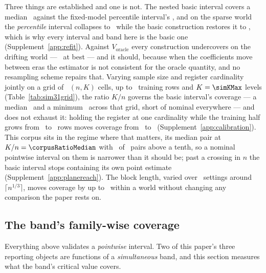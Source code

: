 Three things are established and one is not. The nested basic interval
covers a median \coverageNestedBasicMedian\ against the fixed-model
percentile interval's \coverageNaiveMedian, and on the sparse world the
\emph{percentile} interval collapses to \coverageSparsePct\ while the basic
construction restores it to \coverageSparseBasic, which is why every interval
and band here is the basic one (Supplement~\ref{app:refit}). Against
$V_{\mathrm{oracle}}$ every construction undercovers on the drifting world
--- \coverageDriftOracle\ at best --- and it should, because when the
coefficients move between eras the estimator is not consistent for the
oracle quantity, and no resampling scheme repairs that. Varying sample size
and register cardinality jointly on a grid of \nSimGridCells\ $(n, K)$
cells, up to \simNMax\ training rows and $K = \simKMax$ levels
(Table~\ref{tab:sim31grid}), the ratio $K/n$ governs the basic interval's
coverage --- a median \coverageGridMedian\ and a minimum \coverageGridMin\
across that grid, short
of nominal everywhere --- and does not exhaust it: holding the register at
one cardinality while the training half grows from \simGridFixedNa\ to
\simGridFixedNb\ rows moves coverage from \simGridFixedCovA\ to
\simGridFixedCovB\ (Supplement~\ref{app:calibration}). This corpus sits in
the regime where that matters, its median pair at $K/n = \corpusRatioMedian$
with \nPairsRatioAboveTenth\ of \nPairs\ pairs above a tenth, so a nominal
pointwise interval on them is narrower than it should be; past a crossing in
$n$ the basic interval stops containing its own point estimate
(Supplement~\ref{app:planereach}). The block length, varied over
\nSimBlockLengths\ settings around $\lceil n^{1/3} \rceil$, moves coverage by
up to \coverageBlockSpreadMaxPts\ within a world without changing any
comparison the paper rests on.

\subsection{The band's family-wise coverage}
\label{sec:simband}

Everything above validates a \emph{pointwise} interval. Two of this paper's
three reporting objects are functions of a \emph{simultaneous} band, and this
section measures what the band's critical value covers.

